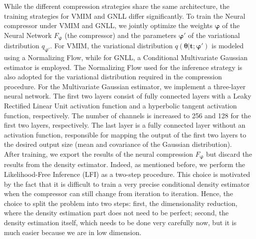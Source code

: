 \documentclass{aa}
\begin{document}
While the different compression strategies share the same architecture, the training strategies for VMIM and GNLL differ significantly. To train the Neural compressor under VMIM and GNLL, we jointly optimize the weights $\bm{\varphi}$ of the Neural Network $F_{\bm{\varphi}}$ (the compressor) and the parameters $\bm{\varphi}'$ of the variational distribution $q_{\bm{\varphi}'}$. For VMIM, the variational distribution $q(\bm{\theta}|\bm{t};\bm{\varphi}')$ is modeled using a Normalizing Flow, while for GNLL, a Conditional Multivariate Gaussian estimator is employed. The Normalizing Flow used for the inference strategy is also adopted for the variational distribution required in the compression procedure.
For the Multivariate Gaussian estimator, we implement a three-layer neural network. The first two layers consist of fully connected layers with a Leaky Rectified Linear Unit activation function and a hyperbolic tangent activation function, respectively. The number of channels is increased to 256 and 128 for the first two layers, respectively. The last layer is a fully connected layer without an activation function, responsible for mapping the output of the first two layers to the desired output size (mean and covariance of the Gaussian distribution). \\
After training, we export the results of the neural compression $F_{\bm{\varphi}}$ but discard the results from the density estimator.
Indeed, as mentioned before, we perform the Likelihood-Free Inference (LFI) as a two-step procedure. This choice is motivated by the fact that it is difficult to train a very precise conditional density estimator when the compressor can still change from iteration to iteration. Hence, the choice to split the problem into two steps: first, the dimensionality reduction, where the density estimation part does not need to be perfect; second, the density estimation itself, which needs to be done very carefully now, but it is much easier because we are in low dimension.
\end{document}
